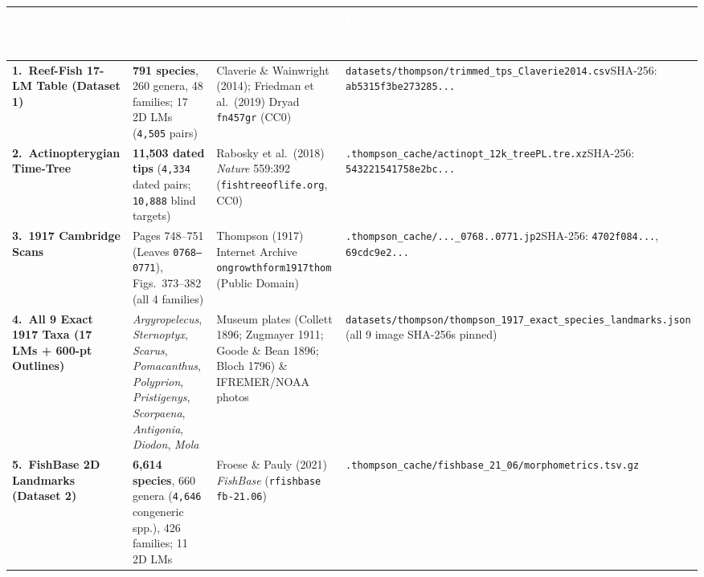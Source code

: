 \documentclass[10pt,a4paper]{article}
\begin{document}
\begin{table}[h!]
\centering
\renewcommand{\arraystretch}{1.20}
\scriptsize
\begin{tabular}{@{}p{}p{}p{}p{}@{}}
\toprule
\rowcolor{navybg}
\textcolor{white}{\textbf{Dataset / Source Asset}} & \textcolor{white}{\textbf{Scale \& Taxonomic Coverage}} & \textcolor{white}{\textbf{Primary Citation \& License}} & \textcolor{white}{\textbf{Local Path \& Cryptographic Pin}} \\
\midrule
\rowcolor{softgray}
\textbf{1.\ Reef-Fish 17-LM Table (Dataset 1)} & \textbf{791 species}, 260 genera, 48 families; 17 2D LMs (\texttt{4,505} pairs) & Claverie \& Wainwright (2014); Friedman et al.\ (2019) Dryad \texttt{fn457gr} (CC0) & \texttt{datasets/thompson/trimmed\_}\newline \texttt{tps\_Claverie2014.csv}\newline SHA-256: \texttt{ab5315f3be273285...} \\
\textbf{2.\ Actinopterygian Time-Tree} & \textbf{11,503 dated tips} (\texttt{4,334} dated pairs; \texttt{10,888} blind targets) & Rabosky et al.\ (2018) \emph{Nature} 559:392 (\texttt{fishtreeoflife.org}, CC0) & \texttt{.thompson\_cache/actinopt\_}\newline \texttt{12k\_treePL.tre.xz}\newline SHA-256: \texttt{543221541758e2bc...} \\
\rowcolor{softgray}
\textbf{3.\ 1917 Cambridge Scans} & Pages 748--751 (Leaves \texttt{0768--0771}), Figs.\ 373--382 (all 4 families) & Thompson (1917) Internet Archive \texttt{ongrowthform1917thom} (Public Domain) & \texttt{.thompson\_cache/...\_0768..0771.jp2}\newline SHA-256: \texttt{4702f084...}, \texttt{69cdc9e2...} \\
\textbf{4.\ All 9 Exact 1917 Taxa (17 LMs + 600-pt Outlines)} & \emph{Argyropelecus}, \emph{Sternoptyx}, \emph{Scarus}, \emph{Pomacanthus}, \emph{Polyprion}, \emph{Pristigenys}, \emph{Scorpaena}, \emph{Antigonia}, \emph{Diodon}, \emph{Mola} & Museum plates (Collett 1896; Zugmayer 1911; Goode \& Bean 1896; Bloch 1796) \& IFREMER/NOAA photos & \texttt{datasets/thompson/thompson\_}\newline \texttt{1917\_exact\_species\_landmarks.json} (all 9 image SHA-256s pinned) \\
\rowcolor{softgray}
\textbf{5.\ FishBase 2D Landmarks (Dataset 2)} & \textbf{6,614 species}, 660 genera (\texttt{4,646} congeneric spp.), 426 families; 11 2D LMs & Froese \& Pauly (2021) \emph{FishBase} (\texttt{rfishbase fb-21.06}) & \texttt{.thompson\_cache/fishbase\_}\newline \texttt{21\_06/morphometrics.tsv.gz} \\

\end{tabular}
\end{table}
\end{document}
